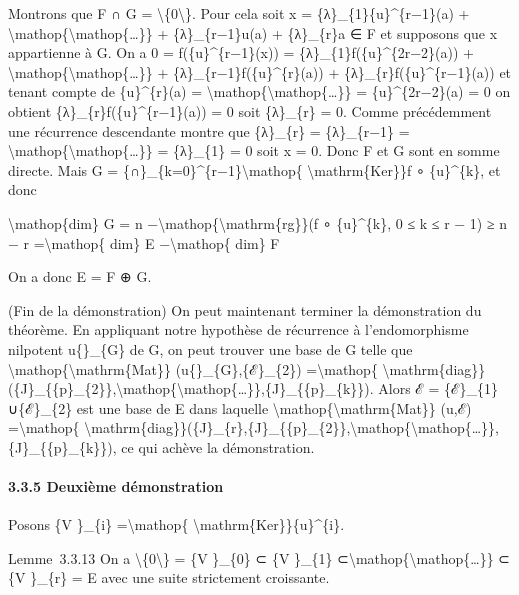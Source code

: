 \documentclass[]{article}
\begin{document}
Montrons que F ∩ G = \textbackslash{}\{0\textbackslash{}\}. Pour cela
soit x = \{λ\}\_\{1\}\{u\}\^{}\{r−1\}(a) +
\textbackslash{}mathop\{\textbackslash{}mathop\{\ldots{}\}\} +
\{λ\}\_\{r−1\}u(a) + \{λ\}\_\{r\}a ∈ F et supposons que x appartienne à
G. On a 0 = f(\{u\}\^{}\{r−1\}(x)) = \{λ\}\_\{1\}f(\{u\}\^{}\{2r−2\}(a))
+ \textbackslash{}mathop\{\textbackslash{}mathop\{\ldots{}\}\} +
\{λ\}\_\{r−1\}f(\{u\}\^{}\{r\}(a)) + \{λ\}\_\{r\}f(\{u\}\^{}\{r−1\}(a))
et tenant compte de \{u\}\^{}\{r\}(a) =
\textbackslash{}mathop\{\textbackslash{}mathop\{\ldots{}\}\} =
\{u\}\^{}\{2r−2\}(a) = 0 on obtient \{λ\}\_\{r\}f(\{u\}\^{}\{r−1\}(a)) =
0 soit \{λ\}\_\{r\} = 0. Comme précédemment une récurrence descendante
montre que \{λ\}\_\{r\} = \{λ\}\_\{r−1\} =
\textbackslash{}mathop\{\textbackslash{}mathop\{\ldots{}\}\} =
\{λ\}\_\{1\} = 0 soit x = 0. Donc F et G sont en somme directe. Mais G =
\{∩\}\_\{k=0\}\^{}\{r−1\}\textbackslash{}mathop\{
\textbackslash{}mathrm\{Ker\}\}f ∘ \{u\}\^{}\{k\}, et donc

\textbackslash{}mathop\{dim\} G = n
−\textbackslash{}mathop\{\textbackslash{}mathrm\{rg\}\}(f ∘
\{u\}\^{}\{k\}, 0 ≤ k ≤ r − 1) ≥ n − r =\textbackslash{}mathop\{ dim\} E
−\textbackslash{}mathop\{ dim\} F

On a donc E = F ⊕ G.

(Fin de la démonstration) On peut maintenant terminer la démonstration
du théorème. En appliquant notre hypothèse de récurrence à
l'endomorphisme nilpotent u\{\textbar{}\}\_\{G\} de G, on peut trouver
une base de G telle que
\textbackslash{}mathop\{\textbackslash{}mathrm\{Mat\}\}
(u\{\textbar{}\}\_\{G\},\{ℰ\}\_\{2\}) =\textbackslash{}mathop\{
\textbackslash{}mathrm\{diag\}\}(\{J\}\_\{\{p\}\_\{2\}\},\textbackslash{}mathop\{\textbackslash{}mathop\{\ldots{}\}\},\{J\}\_\{\{p\}\_\{k\}\}).
Alors ℰ = \{ℰ\}\_\{1\} ∪\{ℰ\}\_\{2\} est une base de E dans laquelle
\textbackslash{}mathop\{\textbackslash{}mathrm\{Mat\}\} (u,ℰ)
=\textbackslash{}mathop\{
\textbackslash{}mathrm\{diag\}\}(\{J\}\_\{r\},\{J\}\_\{\{p\}\_\{2\}\},\textbackslash{}mathop\{\textbackslash{}mathop\{\ldots{}\}\},\{J\}\_\{\{p\}\_\{k\}\}),
ce qui achève la démonstration.

\paragraph{3.3.5 Deuxième démonstration}

Posons \{V \}\_\{i\} =\textbackslash{}mathop\{
\textbackslash{}mathrm\{Ker\}\}\{u\}\^{}\{i\}.

Lemme~3.3.13 On a \textbackslash{}\{0\textbackslash{}\} = \{V \}\_\{0\}
⊂ \{V \}\_\{1\}
⊂\textbackslash{}mathop\{\textbackslash{}mathop\{\ldots{}\}\} ⊂ \{V
\}\_\{r\} = E avec une suite strictement croissante.
\end{document}
